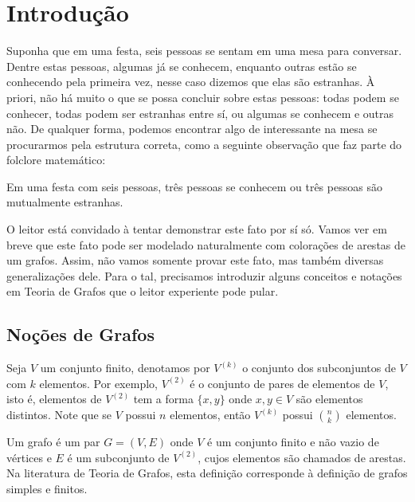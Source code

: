 
\chapter{Introdução}

Suponha que em uma festa, seis pessoas se sentam em uma mesa para conversar. Dentre estas pessoas, algumas já se conhecem, enquanto outras estão se conhecendo pela primeira vez, nesse caso dizemos que elas são estranhas. À priori, não há muito o que se possa concluir sobre estas pessoas: todas podem se conhecer, todas podem ser estranhas entre sí, ou algumas se conhecem e outras não. De qualquer forma, podemos encontrar algo de interessante na mesa se procurarmos pela estrutura correta, como a seguinte observação que faz parte do folclore matemático:

\begin{fact}
Em uma festa com seis pessoas, três pessoas se conhecem ou três pessoas são mutualmente estranhas.
\end{fact}

 O leitor está convidado à tentar demonstrar este fato por sí só. Vamos ver em breve que este fato pode ser modelado naturalmente com colorações de arestas de um grafos. Assim, não vamos somente provar este fato, mas também diversas generalizações dele. Para o tal, precisamos introduzir alguns conceitos e notações em Teoria de Grafos que o leitor experiente pode pular.



\section{Noções de Grafos}

Seja $V$ um conjunto finito, denotamos por $V^{(k)}$ o conjunto dos subconjuntos de $V$ com $k$ elementos. Por exemplo, $V^{(2)}$ é o conjunto de pares de elementos de $V$, isto é, elementos de $V^{(2)}$ tem a forma $\{ x,y\}$ onde $x,y\in V$ são elementos distintos. Note que se $V$ possui $n$ elementos, então $V^{(k)}$ possui $\binom{n}{k}$ elementos.

Um grafo é um par $G = (V,E)$ onde $V$ é um conjunto finito e não vazio de vértices e $E$ é um subconjunto de $V^{(2)}$, cujos elementos são chamados de arestas. Na literatura de Teoria de Grafos, esta definição corresponde à definição de grafos simples e finitos.

